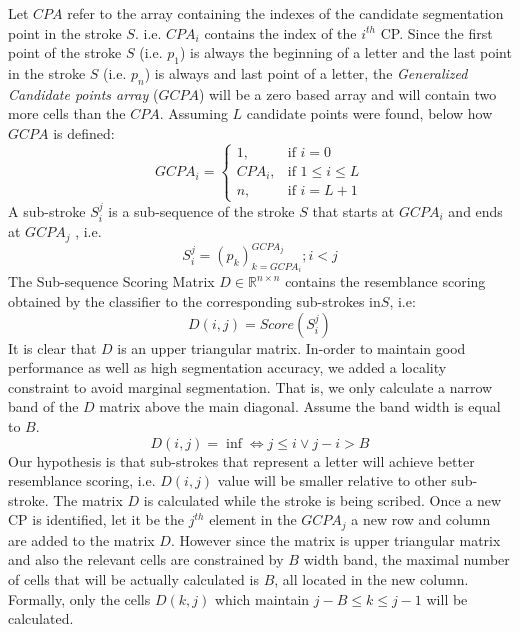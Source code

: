 \documentclass[journal,compsoc]{IEEEtran}
\begin{document}
Let $CPA$ refer to the array containing the indexes of the candidate segmentation point in the stroke $S$. i.e. $CPA_{i}$ contains the index of the $i^{th}$ CP. Since the first point of the stroke $S$ (i.e. $p_{1}$) is always the beginning of a letter and the last point in the stroke $S$ (i.e. $p_{n}$) is always and last point of a letter, the \emph{Generalized Candidate points array} ($GCPA$) will be a zero based array and will contain two more cells than the $CPA$. Assuming $L$ candidate points were found, below how $GCPA$ is defined: 
\begin{equation}
GCPA_{i} =\begin{cases} 1, & \mbox{if } i=0 \\
							CPA_{i}, & \mbox{if } 1\leq i \leq L \\
							n, & \mbox{if } i=L+1 
			\end{cases}				
\end{equation}
A sub-stroke $S_{i}^{j}$ is a sub-sequence of the stroke $S$ that starts at $GCPA_{i}$ and ends at $GCPA_{j}$ , i.e.
\begin{equation}
S_{i}^{j}=(p_{k})_{k=GCPA_{i}}^{GCPA_{j}}; i<j
\end{equation}
The Sub-sequence Scoring Matrix $D\in\mathbb{R}^{n\times n}$ contains the resemblance scoring obtained by the classifier to the corresponding sub-strokes in$S$, i.e:
\begin{equation}
D(i,j)=Score(S_{i}^{j})
\end{equation}
It is clear that $D$ is an upper triangular matrix. In-order to maintain good performance as well as high segmentation accuracy, we added a locality constraint to avoid marginal segmentation. That is, we only calculate a narrow band of the $D$ matrix above the main diagonal. Assume the band width is equal to $B$.
\begin{equation}
D(i,j)=\inf \Leftrightarrow j \leq i \vee j-i>B 
\end{equation}
Our hypothesis is that sub-strokes that represent a letter will achieve better resemblance scoring, i.e. $D(i,j)$ value will be smaller relative to other sub-stroke. The matrix $D$ is calculated while the stroke is being scribed. Once a new CP is identified, let it be the $j^{th}$ element in the $GCPA_{j}$ a new row and column are added to the matrix $D$. However since the matrix is upper triangular matrix and also the relevant cells are constrained by $B$ width band, the maximal number of cells that will be actually calculated is $B$, all located in the new column. Formally, only the cells $D(k,j)$ which maintain $j-B\leq k \leq j-1$ will be calculated.\\
\end{document}
